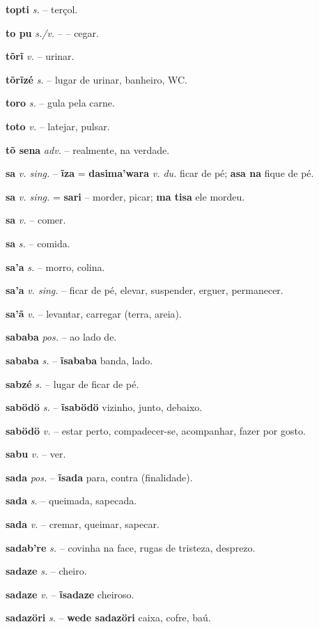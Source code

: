 \textbf{topti} \textit{s.} -- terçol.

\textbf{to pu} \textit{s./v.} -- -- cegar.

\textbf{tõrĩ} \textit{v.} -- urinar.

\textbf{tõrĩzé} \textit{s.} -- lugar de urinar, banheiro, WC.

\textbf{toro} \textit{s.} -- gula pela carne.

\textbf{toto} \textit{v.} -- latejar, pulsar.

\textbf{tõ sena} \textit{adv.} -- realmente, na verdade.

\textbf{sa} \textit{v. sing.} -- \textbf{ĩza} = \textbf{dasima'wara} \textit{v. du.} ficar de pé; \textbf{asa na} fique de pé.

\textbf{sa} \textit{v. sing.} = \textbf{sari} -- morder, picar; \textbf{ma tisa} ele mordeu.

\textbf{sa} \textit{v.} -- comer.

\textbf{sa} \textit{s.} -- comida.

\textbf{sa'a} \textit{s.} -- morro, colina.

\textbf{sa'a} \textit{v. sing.} -- ficar de pé, elevar, suspender, erguer, permanecer.

\textbf{sa'ã} \textit{v.} -- levantar, carregar (terra, areia).

\textbf{sababa} \textit{pos.} -- ao lado de.

\textbf{sababa} \textit{s.} -- \textbf{ĩsababa} banda, lado.

\textbf{sabzé} \textit{s.} -- lugar de ficar de pé.

\textbf{sabödö} \textit{s.} -- \textbf{ĩsabödö} vizinho, junto, debaixo.

\textbf{sabödö} \textit{v.} -- estar perto, compadecer-se, acompanhar, fazer por gosto.

\textbf{sabu} \textit{v.} -- ver.

\textbf{sada} \textit{pos.} -- \textbf{ĩsada} para, contra (finalidade).

\textbf{sada} \textit{s.} -- queimada, sapecada.

\textbf{sada} \textit{v.} -- cremar, queimar, sapecar.

\textbf{sadab're} \textit{s.} -- covinha na face, rugas de tristeza, desprezo.

\textbf{sadaze} \textit{s.} -- cheiro.

\textbf{sadaze} \textit{v.} -- \textbf{ĩsadaze} cheiroso.

\textbf{sadazöri} \textit{s.} -- \textbf{wede sadazöri} caixa, cofre, baú.

